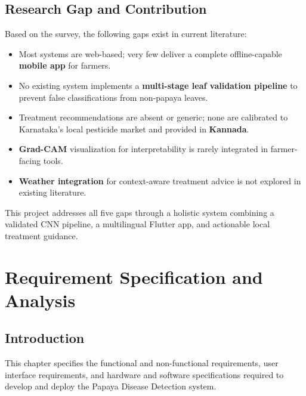 \documentclass[12pt,a4paper]{report}
\begin{document}
\section{Research Gap and Contribution}
Based on the survey, the following gaps exist in current literature:
\begin{itemize}
    \item Most systems are web-based; very few deliver a complete offline-capable \textbf{mobile app} for farmers.
    \item No existing system implements a \textbf{multi-stage leaf validation pipeline} to prevent false classifications from non-papaya leaves.
    \item Treatment recommendations are absent or generic; none are calibrated to Karnataka's local pesticide market and provided in \textbf{Kannada}.
    \item \textbf{Grad-CAM} visualization for interpretability is rarely integrated in farmer-facing tools.
    \item \textbf{Weather integration} for context-aware treatment advice is not explored in existing literature.
\end{itemize}

This project addresses all five gaps through a holistic system combining a validated CNN pipeline, a multilingual Flutter app, and actionable local treatment guidance.

\chapter{Requirement Specification and Analysis}

\section{Introduction}
This chapter specifies the functional and non-functional requirements, user interface requirements, and hardware and software specifications required to develop and deploy the Papaya Disease Detection system.
\end{document}
